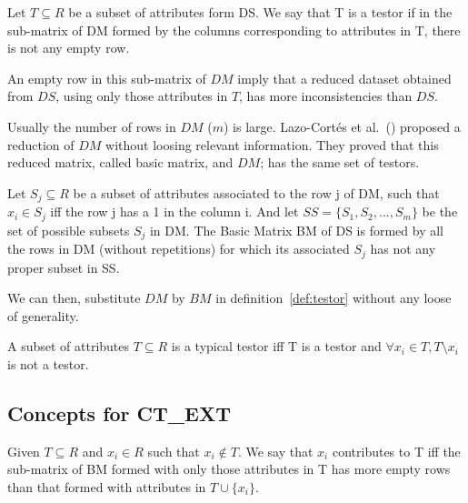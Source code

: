\documentclass[citeauthoryear]{llncs}
\begin{document}
	\begin{definition}\label{def:testor}
		Let $T \subseteq R$ be a subset of attributes form DS. We say that T is a testor if in the sub-matrix
		of DM formed by the columns corresponding to attributes in T, there is not any empty row.
	\end{definition}
	
	An empty row in this sub-matrix of $DM$ imply that a reduced dataset obtained from $DS$, using only those 
	attributes in $T$, has more inconsistencies than $DS$. 	
	
	Usually the number of rows in $DM$ ($m$) is large. Lazo-Cort\'es et al.~(\cite{Lazo2001}) proposed a reduction
	of $DM$ without loosing relevant information. They proved that this reduced matrix, called basic matrix, and
	$DM$; has the same set of testors. 
	
	\begin{definition} \label{def:BM}
		Let $S_{j} \subseteq R$ be a subset of attributes associated to the row j of DM, such that $x_i \in S_{j}$
		iff the row j has a 1 in the column i. And let $SS=\lbrace S_1, S_2,...,S_m  \rbrace$ be the set of possible
		subsets $S_{j}$ in DM. The Basic Matrix BM of DS is formed by all the rows in DM (without repetitions) for 
		which its associated $S_{j}$ has not any proper subset in SS.
	\end{definition}
	
	We can then, substitute $DM$ by $BM$ in definition~\ref{def:testor} without 
	any loose of generality.
	
	\begin{definition}\label{def:TT}
		A subset of attributes $T \subseteq R$ is a typical testor iff T is a testor and
		$\forall x_i \in T, T \setminus x_i$ is not a testor. 
	\end{definition}	
%	
\subsection{Concepts for CT\_EXT}
%
		
	\begin{definition}\label{def:contrib}
		Given $T \subseteq R$ and $x_i \in R$ such that $x_i \notin T$. We say that $x_i$ contributes to T iff 
		the sub-matrix of BM formed with only those attributes in T has more empty rows than that formed with attributes
		in $T \cup \lbrace x_i \rbrace$.
	\end{definition}	
	
\end{document}
